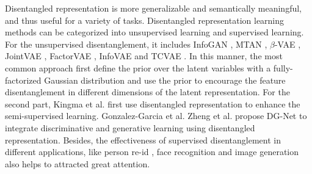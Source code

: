 \documentclass[10pt,twocolumn,letterpaper]{article}
\begin{document}
Disentangled representation is more generalizable and semantically meaningful, and thus useful for a variety of tasks.
Disentangled representation learning methods can be categorized into unsupervised learning and supervised learning.
For the unsupervised disentanglement, it includes InfoGAN \cite{chen2016infogan}, MTAN \cite{liu2018multi}, $\beta$-VAE \cite{higgins2017beta}, JointVAE \cite{dupont2018learning}, FactorVAE \cite{kim2018disentangling}, InfoVAE \cite{zhao2017infovae} and TCVAE \cite{chen2018isolating}. 
In this manner, the most common approach first define the prior over the latent variables with a fully-factorized Gaussian distribution and use the prior to encourage the feature disentanglement in different dimensions of the latent representation.
For the second part, Kingma et al. \cite{kingma2014semi} first use disentangled representation to enhance the semi-supervised learning. Gonzalez-Garcia et al. Zheng et al. \cite{zheng2019joint} propose DG-Net to integrate discriminative and generative learning using disentangled representation. Besides, the effectiveness of supervised disentanglement in different applications, like person re-id \cite{zheng2019joint}, face recognition \cite{liu2018unified, liu2018exploring, shu2017neural, tran2017disentangled} and image generation \cite{ma2018disentangled, yan2016attribute2image, mathieu2016disentangling, jha2018disentangling} also helps to attracted great attention.

\end{document}
